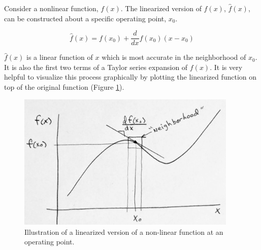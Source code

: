 Consider a nonlinear function, $f(x)$.  The linearized version of $f(x)$, $\hat{f}(x)$,  can be constructed about a specific operating point, $x_0$.

\[
\hat{f}(x) = f(x_0) + \frac{d}{dx}f(x_0) (x-x_0)
\]

$\hat{f}(x)$ is a linear function of $x$ which is most accurate in the neighborhood of $x_0$.
It is also the  first two terms of a Taylor series expansion of $f(x)$.   It is very helpful to
visualize this process graphically by plotting the linearized function on top of the original
function (Figure \ref{loclinSketch}).

\begin{figure}
  \includegraphics[width=105mm]{figs01/Q75B05.png}
  \caption{Illustration of a linearized version of a non-linear function at an operating point.}\label{loclinSketch}
\end{figure}


\clearpage

